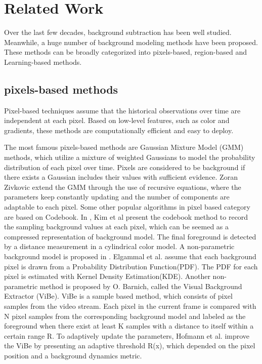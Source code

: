 \documentclass[journal]{IEEEtran}
\begin{document}
\section{Related Work}
\label{sec2}
Over the last few decades, background subtraction has been well studied. Meanwhile, a huge number of background modeling methods have been proposed. 
These methods can be broadly categorized into pixels-based, region-based and Learning-based methods.
\subsection{pixels-based methods}
Pixel-based techniques assume that the historical observations over time are independent at each pixel. Based on low-level features, such as color and gradients, these methods are computationally efficient and easy to deploy. 

The most famous pixels-based methods are Gaussian Mixture Model (GMM) methods\cite{Stauffer1999}, which utilize a mixture of weighted Gaussians to model the probability distribution of each pixel over time. Pixels are considered to be background if there exists a Gaussian includes their values with sufficient evidence. 
Zoran Zivkovic\cite{Zivkovic2004} extend the GMM through the use of recursive equations, where the parameters keep constantly updating and the number of components are adaptable to each pixel. 
Some other popular algorithms in pixel based category are based on Codebook. 
In \cite{Kim2005}, Kim et al present the codebook method to record the sampling background values at each pixel, which can be seemed as a compressed representation of background model. The final foreground is detected by a distance measurement in a cylindrical color model.
A non-parametric background model is proposed in \cite{Elgammal2000Non}. Elgammal et al. assume that each background pixel is drawn from a Probability Distribution Function(PDF). The PDF for each pixel is estimated with Kernel Density Estimation(KDE). 
Another non-parametric method is proposed by O. Barnich, called the Visual Background Extractor (ViBe)\cite{Barnich2011_2011_TIP}. ViBe is a sample based method, which consists of pixel samples from the video stream. Each pixel in the current frame is compared with N pixel samples from the corresponding background model and labeled as the foreground when there exist at least K samples with a distance to itself within a certain range R. 
To adaptively update the parameters, Hofmann et al.\cite{Hofmann2012Background} improve the ViBe by presenting an adaptive threshold R(x), which depended on the pixel position and a background dynamics metric.
\end{document}
